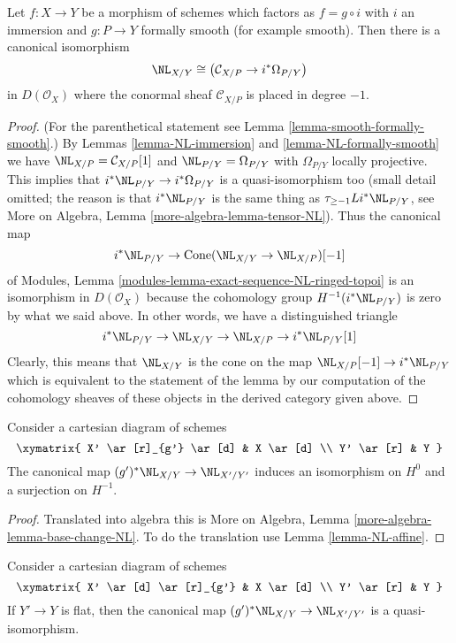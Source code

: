 \begin{lemma}
\label{lemma-get-NL}
Let $f : X \to Y$ be a morphism of schemes which factors
as $f = g \circ i$ with $i$ an immersion and $g : P \to Y$
formally smooth (for example smooth). Then there is a canonical isomorphism
$$
\NL_{X/Y} \cong \left(\mathcal{C}_{X/P} \to i^*\Omega_{P/Y}\right)
$$
in $D(\mathcal{O}_X)$ where the conormal sheaf $\mathcal{C}_{X/P}$
is placed in degree $-1$.
\end{lemma}

\begin{proof}
(For the parenthetical statement see Lemma \ref{lemma-smooth-formally-smooth}.)
By Lemmas \ref{lemma-NL-immersion} and \ref{lemma-NL-formally-smooth} we have
$\NL_{X/P} = \mathcal{C}_{X/P}[1]$ and $\NL_{P/Y} = \Omega_{P/Y}$ with
$\Omega_{P/Y}$ locally projective. This implies that
$i^*\NL_{P/Y} \to i^*\Omega_{P/Y}$ is a quasi-isomorphism too
(small detail omitted; the reason is that $i^*\NL_{P/Y}$ is the
same thing as $\tau_{\geq -1}Li^*\NL_{P/Y}$, see More on Algebra, Lemma
\ref{more-algebra-lemma-tensor-NL}).
Thus the canonical map
$$
i^*\NL_{P/Y} \to \text{Cone}(\NL_{X/Y} \to \NL_{X/P})[-1]
$$
of Modules, Lemma \ref{modules-lemma-exact-sequence-NL-ringed-topoi}
is an isomorphism in $D(\mathcal{O}_X)$ because the cohomology
group $H^{-1}(i^*\NL_{P/Y})$ is zero by what we said above.
In other words, we have a distinguished triangle
$$
i^*\NL_{P/Y} \to \NL_{X/Y} \to \NL_{X/P} \to i^*\NL_{P/Y}[1]
$$
Clearly, this means that $\NL_{X/Y}$ is the cone on the map
$\NL_{X/P}[-1] \to i^*\NL_{P/Y}$ which is equivalent to the
statement of the lemma by our computation of the cohomology
sheaves of these objects in the derived category given above.
\end{proof}

\begin{lemma}
\label{lemma-base-change-NL}
Consider a cartesian diagram of schemes
$$
\xymatrix{
X' \ar[r]_{g'} \ar[d] & X \ar[d] \\
Y' \ar[r] & Y
}
$$
The canonical map $(g')^*\NL_{X/Y} \to \NL_{X'/Y'}$ induces
an isomorphism on $H^0$ and a surjection on $H^{-1}$.
\end{lemma}

\begin{proof}
Translated into algebra this is
More on Algebra, Lemma \ref{more-algebra-lemma-base-change-NL}.
To do the translation use Lemma \ref{lemma-NL-affine}.
\end{proof}

\begin{lemma}
\label{lemma-flat-base-change-NL}
Consider a cartesian diagram of schemes
$$
\xymatrix{
X' \ar[d] \ar[r]_{g'} & X \ar[d] \\
Y' \ar[r] & Y
}
$$
If $Y' \to Y$ is flat, then the canonical map
$(g')^*\NL_{X/Y} \to \NL_{X'/Y'}$ is a quasi-isomorphism.
\end{lemma}

